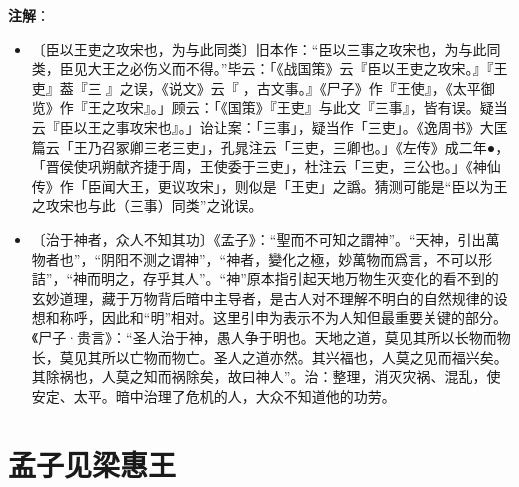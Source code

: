 \documentclass[12pt,UTF-8,openany]{ctexbook}
\begin{document}
\newpage

\textbf{注解}：

\vspace{-1em}

\begin{itemize}
    \setlength\itemsep{-0.2em}
    \item〔臣以王吏之攻宋也，为与此同类〕旧本作：“臣以三事之攻宋也，为与此同类，臣见大王之必伤义而不得。”毕云：「《战国策》云『臣以王吏之攻宋。』『王吏』葢『三𠭏』之误，《说文》云『𠭏，古文事。』《尸子》作『王使』，《太平御览》作『王之攻宋』。」顾云：「《国策》『王吏』与此文『三事』，皆有误。疑当云『臣以王之事攻宋也』。」诒让案：「三事」，疑当作「三吏」。《逸周书》大匡篇云「王乃召冢卿三老三吏」，孔晁注云「三吏，三卿也。」《左传》成二年●，「晋侯使巩朔献齐捷于周，王使委于三吏」，杜注云「三吏，三公也。」《神仙传》作「臣闻大王，更议攻宋」，则似是「王吏」之譌。猜测可能是“臣以为王之攻宋也与此（三事）同类”之讹误。
    \item〔治于神者，众人不知其功〕《孟子》：“聖而不可知之謂神”。“天神，引出萬物者也”，“阴阳不测之谓神”，“神者，變化之極，妙萬物而爲言，不可以形詰”，“神而明之，存乎其人”。“神”原本指引起天地万物生灭变化的看不到的玄妙道理，藏于万物背后暗中主导者，是古人对不理解不明白的自然规律的设想和称呼，因此和“明”相对。这里引申为表示不为人知但最重要关键的部分。《尸子·贵言》：“圣人治于神，愚人争于明也。天地之道，莫见其所以长物而物长，莫见其所以亡物而物亡。圣人之道亦然。其兴福也，人莫之见而福兴矣。其除祸也，人莫之知而祸除矣，故曰神人”。治：整理，消灭灾祸、混乱，使安定、太平。暗中治理了危机的人，大众不知道他的功劳。
\end{itemize}

\chapter{孟子见梁惠王}
\end{document}
